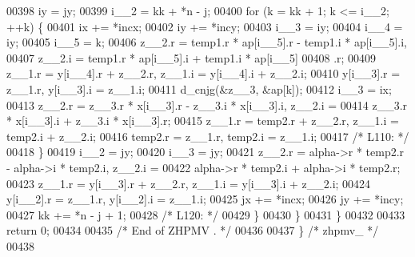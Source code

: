 \begin{DoxyCode}
00398         iy = jy;
00399         i\_\_2 = kk + *n - j;
00400         \textcolor{keywordflow}{for} (k = kk + 1; k <= i\_\_2; ++k) \{
00401             ix += *incx;
00402             iy += *incy;
00403             i\_\_3 = iy;
00404             i\_\_4 = iy;
00405             i\_\_5 = k;
00406             z\_\_2.r = temp1.r * ap[i\_\_5].r - temp1.i * ap[i\_\_5].i, 
00407                 z\_\_2.i = temp1.r * ap[i\_\_5].i + temp1.i * ap[i\_\_5]
00408                 .r;
00409             z\_\_1.r = y[i\_\_4].r + z\_\_2.r, z\_\_1.i = y[i\_\_4].i + z\_\_2.i;
00410             y[i\_\_3].r = z\_\_1.r, y[i\_\_3].i = z\_\_1.i;
00411             d\_cnjg(&z\_\_3, &ap[k]);
00412             i\_\_3 = ix;
00413             z\_\_2.r = z\_\_3.r * x[i\_\_3].r - z\_\_3.i * x[i\_\_3].i, z\_\_2.i =
00414                  z\_\_3.r * x[i\_\_3].i + z\_\_3.i * x[i\_\_3].r;
00415             z\_\_1.r = temp2.r + z\_\_2.r, z\_\_1.i = temp2.i + z\_\_2.i;
00416             temp2.r = z\_\_1.r, temp2.i = z\_\_1.i;
00417 \textcolor{comment}{/* L110: */}
00418         \}
00419         i\_\_2 = jy;
00420         i\_\_3 = jy;
00421         z\_\_2.r = alpha->r * temp2.r - alpha->i * temp2.i, z\_\_2.i = 
00422             alpha->r * temp2.i + alpha->i * temp2.r;
00423         z\_\_1.r = y[i\_\_3].r + z\_\_2.r, z\_\_1.i = y[i\_\_3].i + z\_\_2.i;
00424         y[i\_\_2].r = z\_\_1.r, y[i\_\_2].i = z\_\_1.i;
00425         jx += *incx;
00426         jy += *incy;
00427         kk += *n - j + 1;
00428 \textcolor{comment}{/* L120: */}
00429         \}
00430     \}
00431     \}
00432 
00433     \textcolor{keywordflow}{return} 0;
00434 
00435 \textcolor{comment}{/*     End of ZHPMV . */}
00436 
00437 \} \textcolor{comment}{/* zhpmv\_ */}
00438 
\end{DoxyCode}
